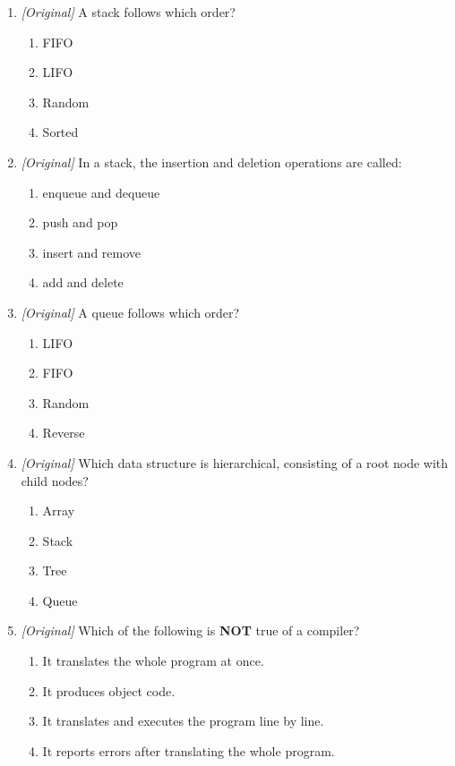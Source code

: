 \begin{enumerate}[label=\textbf{Q\arabic*.}, leftmargin=*]
\begin{enumerate}[label=\Alph*.]
  \end{enumerate}
\item \textit{[Original]} A stack follows which order?
  \begin{enumerate}[label=\Alph*.]
    \item FIFO
    \item LIFO
    \item Random
    \item Sorted
  \end{enumerate}
\item \textit{[Original]} In a stack, the insertion and deletion operations
  are called:
  \begin{enumerate}[label=\Alph*.]
    \item enqueue and dequeue
    \item push and pop
    \item insert and remove
    \item add and delete
  \end{enumerate}
\item \textit{[Original]} A queue follows which order?
  \begin{enumerate}[label=\Alph*.]
    \item LIFO
    \item FIFO
    \item Random
    \item Reverse
  \end{enumerate}
\item \textit{[Original]} Which data structure is hierarchical, consisting of
  a root node with child nodes?
  \begin{enumerate}[label=\Alph*.]
    \item Array
    \item Stack
    \item Tree
    \item Queue
  \end{enumerate}
\item \textit{[Original]} Which of the following is \textbf{NOT} true of a
  compiler?
  \begin{enumerate}[label=\Alph*.]
    \item It translates the whole program at once.
    \item It produces object code.
    \item It translates and executes the program line by line.
    \item It reports errors after translating the whole program.
  \end{enumerate}

\end{enumerate}
